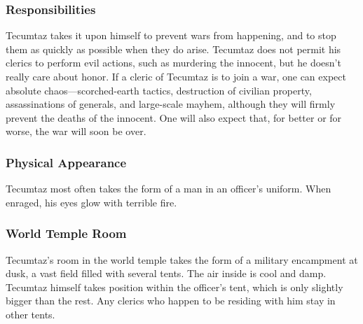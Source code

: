 \subsubsection*{Responsibilities}
Tecumtaz takes it upon himself to prevent wars from happening, and to stop them as quickly as possible when they do arise.
Tecumtaz does not permit his clerics to perform evil actions, such as murdering the innocent, but he doesn't really care about honor.
If a cleric of Tecumtaz is to join a war, one can expect absolute chaos---scorched-earth tactics, destruction of civilian property, assassinations of generals, and large-scale mayhem, although they will firmly prevent the deaths of the innocent.
One will also expect that, for better or for worse, the war will soon be over.

\subsubsection*{Physical Appearance} 
Tecumtaz most often takes the form of a man in an officer's uniform.
When enraged, his eyes glow with terrible fire.

\subsubsection*{World Temple Room}
Tecumtaz's room in the world temple takes the form of a military encampment at dusk, a vast field filled with several tents.
The air inside is cool and damp.
Tecumtaz himself takes position within the officer's tent, which is only slightly bigger than the rest.
Any clerics who happen to be residing with him stay in other tents.